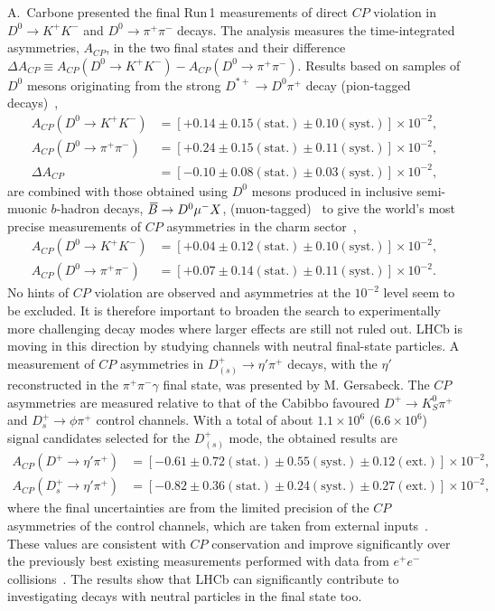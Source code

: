 \documentclass{PoS}
\newcommand{\CP}{{\ensuremath{C\!P}}\xspace}
\newcommand{\Dz}{\ensuremath{D^0}\xspace}
\def\Bbar{{\ensuremath{\kern 0.18em\overline{\kern -0.18em \ensuremath{B}}{}}}\xspace}
\newcommand{\stat}{\ensuremath{(\mathrm{stat.})}}
\newcommand{\syst}{\ensuremath{(\mathrm{syst.})}}
\begin{document}
A.~Carbone presented the final Run\,1 measurements of direct \CP violation in $D^0\to K^+K^-$ and $D^0\to\pi^+\pi^-$ decays. The analysis measures the time-integrated asymmetries, $A_{\CP}$, in the two final states and their difference $\Delta A_{\CP}\equiv A_{\CP}(\Dz\to K^+K^-)-A_{\CP}(\Dz\to\pi^+\pi^-)$. Results based on samples of \Dz mesons originating from the strong $D^{*+}\to\Dz\pi^+$ decay (pion-tagged decays)~\cite{LHCb-PAPER-2015-055,LHCb-PAPER-2016-035},
\begin{align*}
A_{\CP}(D^0\to K^+K^-) & = \left[+0.14\pm0.15\stat\pm0.10\syst\right]\times10^{-2},\\
A_{\CP}(D^0\to \pi^+\pi^-) & = \left[+0.24\pm0.15\stat\pm0.11\syst\right]\times10^{-2},\\
\Delta A_{\CP} & = \left[-0.10\pm0.08\stat\pm0.03\syst\right]\times10^{-2},
\end{align*}
are combined with those obtained using \Dz mesons produced in inclusive semi-muonic $b$-hadron decays, $\Bbar\to\Dz\mu^-X$, (muon-tagged)~\cite{LHCb-PAPER-2013-003} to give the world's most precise measurements of \CP asymmetries in the charm sector~\cite{LHCb-PAPER-2016-035},
\begin{align*}
A_{\CP}(D^0\to K^+K^-) & = \left[+0.04\pm0.12\stat\pm0.10\syst\right]\times10^{-2},\\
A_{\CP}(D^0\to \pi^+\pi^-) & = \left[+0.07\pm0.14\stat\pm0.11\syst\right]\times10^{-2}.
\end{align*}
No hints of \CP violation are observed and asymmetries at the $10^{-2}$ level seem to be excluded. It is therefore important to broaden the search to experimentally more challenging decay modes where larger effects are still not ruled out. LHCb is moving in this direction by studying channels with neutral final-state particles. A measurement of \CP asymmetries in $D^+_{(s)}\to\eta'\pi^+$ decays, with the $\eta'$ reconstructed in the $\pi^+\pi^-\gamma$ final state, was presented by M. Gersabeck. The \CP asymmetries are measured relative to that of the Cabibbo favoured $D^+\to K_S^0\pi^+$ and $D^+_s\to\phi\pi^+$ control channels. With a total of about $1.1\times10^6$ ($6.6\times10^6$) signal candidates selected for the $D^+_{(s)}$ mode, the obtained results are~\cite{LHCb-PAPER-2016-041}
\begin{align*}
A_{\CP}(D^+\to \eta'\pi^+) & = \left[-0.61\pm0.72\stat\pm0.55\syst\pm0.12(\mathrm{ext.})\right]\times10^{-2},\\
A_{\CP}(D^+_s\to \eta'\pi^+) & = \left[-0.82\pm0.36\stat\pm0.24\syst\pm0.27(\mathrm{ext.})\right]\times10^{-2},
\end{align*}
where the final uncertainties are from the limited precision of the \CP asymmetries of the control channels, which are taken from external inputs~\cite{Ko:2012pe,Abazov:2013woa}. These values are consistent with \CP conservation and improve significantly over the previously best existing measurements performed with data from $e^+e^-$ collisions~\cite{Won:2011ku,Onyisi:2013bjt}. The results show that LHCb can significantly contribute to investigating decays with neutral particles in the final state too.
\end{document}
